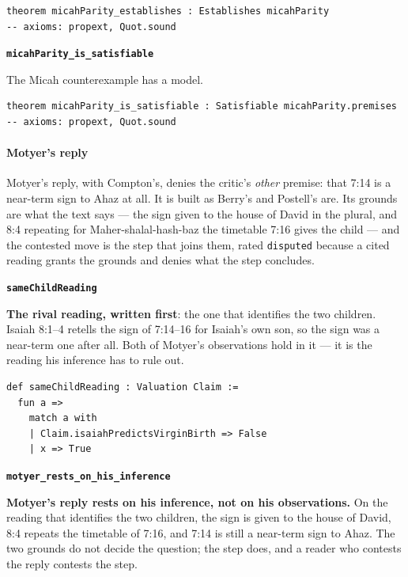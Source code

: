\documentclass[11pt]{article}
\begin{document}
{\small\begin{verbatim}
theorem micahParity_establishes : Establishes micahParity
-- axioms: propext, Quot.sound
\end{verbatim}}
\par\medskip\noindent\textbf{\texttt{micah\allowbreak{}Parity\_\allowbreak{}is\_\allowbreak{}satisfiable}}\par\nobreak\noindent
The Micah counterexample has a model.

{\small\begin{verbatim}
theorem micahParity_is_satisfiable : Satisfiable micahParity.premises
-- axioms: propext, Quot.sound
\end{verbatim}}
\paragraph*{Motyer's reply}
\leavevmode\par
Motyer's reply, with Compton's, denies the critic's \emph{other} premise: that 7:14 is a near-term sign to Ahaz at all. It is built as Berry's and Postell's are. Its grounds are what the text says — the sign given to the house of David in the plural, and 8:4 repeating for Maher-shalal-hash-baz the timetable 7:16 gives the child — and the contested move is the step that joins them, rated \texttt{disputed} because a cited reading grants the grounds and denies what the step concludes.

\par\medskip\noindent\textbf{\texttt{same\allowbreak{}Child\allowbreak{}Reading}}\par\nobreak\noindent
\textbf{The rival reading, written first}: the one that identifies the two children. Isaiah 8:1–4 retells the sign of 7:14–16 for Isaiah's own son, so the sign was a near-term one after all. Both of Motyer's observations hold in it — it is the reading his inference has to rule out.

{\small\begin{verbatim}
def sameChildReading : Valuation Claim :=
  fun a =>
    match a with
    | Claim.isaiahPredictsVirginBirth => False
    | x => True
\end{verbatim}}
\par\medskip\noindent\textbf{\texttt{motyer\_\allowbreak{}rests\_\allowbreak{}on\_\allowbreak{}his\_\allowbreak{}inference}}\par\nobreak\noindent
\textbf{Motyer's reply rests on his inference, not on his observations.} On the reading that identifies the two children, the sign is given to the house of David, 8:4 repeats the timetable of 7:16, and 7:14 is still a near-term sign to Ahaz. The two grounds do not decide the question; the step does, and a reader who contests the reply contests the step.
\end{document}
